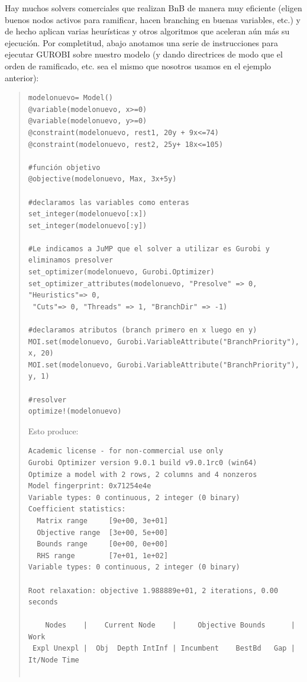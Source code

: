     
Hay muchos solvers comerciales que realizan BnB de manera muy eficiente (eligen buenos nodos activos para ramificar, hacen branching en buenas variables, etc.) y de hecho aplican varias heurísticas y otros algoritmos que aceleran aún más su ejecución. Por completitud, abajo anotamos una serie de instrucciones para ejecutar GUROBI sobre nuestro modelo (y dando directrices de modo que el orden de ramificado, etc. sea el mismo que nosotros usamos en el ejemplo anterior):

    	\begin{quote}
    		\begin{lstlisting}
modelonuevo= Model()
@variable(modelonuevo, x>=0)
@variable(modelonuevo, y>=0)
@constraint(modelonuevo, rest1, 20y + 9x<=74)
@constraint(modelonuevo, rest2, 25y+ 18x<=105)

#función objetivo
@objective(modelonuevo, Max, 3x+5y)

#declaramos las variables como enteras
set_integer(modelonuevo[:x])
set_integer(modelonuevo[:y])

#Le indicamos a JuMP que el solver a utilizar es Gurobi y eliminamos presolver
set_optimizer(modelonuevo, Gurobi.Optimizer)
set_optimizer_attributes(modelonuevo, "Presolve" => 0, "Heuristics"=> 0, 
 "Cuts"=> 0, "Threads" => 1, "BranchDir" => -1) 

#declaramos atributos (branch primero en x luego en y)
MOI.set(modelonuevo, Gurobi.VariableAttribute("BranchPriority"), x, 20)  
MOI.set(modelonuevo, Gurobi.VariableAttribute("BranchPriority"), y, 1)  

#resolver
optimize!(modelonuevo)
\end{lstlisting}
\vspace{-10pt}
Esto produce:
\vspace{-10pt}
\begin{lstlisting}[backgroundcolor=\color{light_gray}]
Academic license - for non-commercial use only
Gurobi Optimizer version 9.0.1 build v9.0.1rc0 (win64)
Optimize a model with 2 rows, 2 columns and 4 nonzeros
Model fingerprint: 0x71254e4e
Variable types: 0 continuous, 2 integer (0 binary)
Coefficient statistics:
  Matrix range     [9e+00, 3e+01]
  Objective range  [3e+00, 5e+00]
  Bounds range     [0e+00, 0e+00]
  RHS range        [7e+01, 1e+02]
Variable types: 0 continuous, 2 integer (0 binary)

Root relaxation: objective 1.988889e+01, 2 iterations, 0.00 seconds

    Nodes    |    Current Node    |     Objective Bounds      |     Work
 Expl Unexpl |  Obj  Depth IntInf | Incumbent    BestBd   Gap | It/Node Time


\end{lstlisting}
\end{quote}
